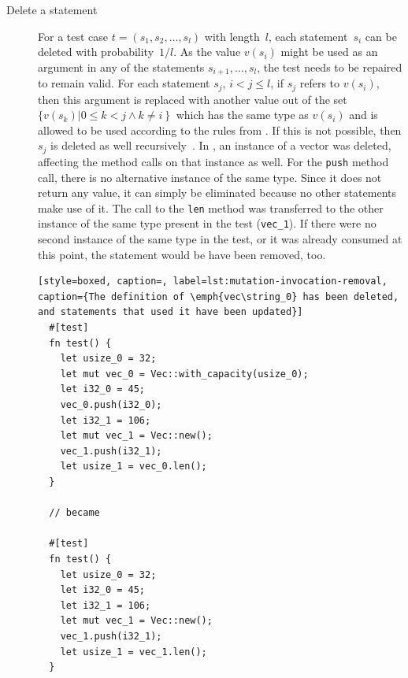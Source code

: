 \documentclass[paper=a4,%
  twoside,%
  BCOR4mm,%
  abstract=true,%
  toc=bibliography,%
  chapterprefix=true,%
  toc=bibliographynumbered,%
  open=right,%
  english,%
  pagesize=pdftex]{scrreprt}
\begin{document}
\begin{description}
  \item[Delete a statement] For a test case $t = (s_1, s_2, \dots, s_l)$ with length~$l$, each statement~$s_i$ can be deleted with probability~$1/l$. As the value $v(s_i)$ might be used as an argument in any of the statements $s_{i+1}, \dots, s_l$, the test needs to be repaired to remain valid. For each statement $s_j$, $i < j \leq l$, if $s_j$ refers to $v(s_i)$, then this argument is replaced with another value out of the set $\{v(s_k) \left| 0 \leq k < j \wedge k \neq i \right\}$ which has the same type as $v(s_i)$ and is allowed to be used according to the rules from . If this is not possible, then $s_j$ is deleted as well recursively~\cite{Fraser2012}. In , an instance of a vector was deleted, affecting the method calls on that instance as well. For the \texttt{push} method call, there is no alternative instance of the same type. Since it does not return any value, it can simply be eliminated because no other statements make use of it. The call to the \texttt{len} method was transferred to the other instance of the same type present in the test (\texttt{vec\string_1}). If there were no second instance of the same type in the test, or it was already consumed at this point, the statement would be have been removed, too.

  \begin{lstlisting}[style=boxed, caption=, label=lst:mutation-invocation-removal, caption={The definition of \emph{vec\string_0} has been deleted, and statements that used it have been updated}]
  #[test]
  fn test() {
    let usize_0 = 32;
    let mut vec_0 = Vec::with_capacity(usize_0);
    let i32_0 = 45;
    vec_0.push(i32_0);
    let i32_1 = 106;
    let mut vec_1 = Vec::new();
    vec_1.push(i32_1);
    let usize_1 = vec_0.len();
  }

  // became

  #[test]
  fn test() {
    let usize_0 = 32;
    let i32_0 = 45;
    let i32_1 = 106;
    let mut vec_1 = Vec::new();
    vec_1.push(i32_1);
    let usize_1 = vec_1.len();
  }
  \end{lstlisting}

\end{description}
\end{document}
